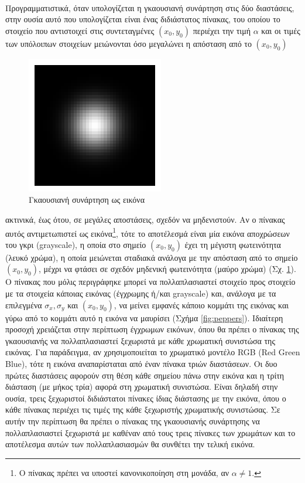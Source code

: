 \paragraph*{}
Προγραμματιστικά, όταν υπολογίζεται η γκαουσιανή συνάρτηση στις δύο διαστάσεις, στην ουσία αυτό που υπολογίζεται είναι ένας διδιάστατος πίνακας, του οποίου το στοιχείο που αντιστοιχεί στις συντεταγμένες $(x_0,y_0)$ περιέχει την τιμή $\alpha$ και οι τιμές των υπόλοιπων στοιχείων μειώνονται όσο μεγαλώνει η απόσταση από το $(x_0,y_0)$
\begin{figure}
\centerline{\includegraphics[scale=0.25]{./images/gauss2DImage.png}}
\caption{Γκαουσιανή συνάρτηση ως εικόνα}
\label{fig:2dbellimage}
\end{figure}
ακτινικά, έως ότου, σε μεγάλες αποστάσεις, σχεδόν να μηδενιστούν. Αν ο πίνακας αυτός αντιμετωπιστεί ως εικόνα\footnote{Ο πίνακας πρέπει να υποστεί κανονικοποίηση στη μονάδα, αν $\alpha \neq 1$.}, τότε το αποτέλεσμά είναι μία εικόνα αποχρώσεων του γκρι (grayscale), η οποία στο σημείο $(x_0,y_0)$ έχει τη μέγιστη φωτεινότητα (λευκό χρώμα), η οποία μειώνεται σταδιακά ανάλογα με την απόσταση από το σημείο $(x_0,y_0)$, μέχρι να φτάσει σε σχεδόν μηδενική φωτεινότητα (μαύρο χρώμα) (Σχ. \ref{fig:2dbellimage}). Ο πίνακας που μόλις περιγράφηκε μπορεί να πολλαπλασιαστεί στοιχείο προς στοιχείο με τα στοιχεία κάποιας εικόνας (έγχρωμης ή/και grayscale) και, ανάλογα με τα επιλεγμένα $\sigma_x,\sigma_y$ και $(x_0,y_0)$, να μείνει εμφανές κάποιο κομμάτι της εικόνας και γύρω από το κομμάτι αυτό η εικόνα να μαυρίσει (Σχήμα \ref{fig:peppers}). Ιδιαίτερη προσοχή χρειάζεται στην περίπτωση έγχρωμων εικόνων, όπου θα πρέπει ο πίνακας της γκαουσιανής να πολλαπλασιαστεί ξεχωριστά με κάθε χρωματική συνιστώσα της εικόνας. Για παράδειγμα, αν χρησιμοποιείται το χρωματικό μοντέλο RGB (Red Green Blue), τότε η εικόνα αναπαρίσταται από έναν πίνακα τριών διαστάσεων. Οι δυο πρώτες διαστάσεις αφορούν στη θέση κάθε σημείου πάνω στην εικόνα και η τρίτη διάσταση (με μήκος τρία) αφορά στη χρωματική συνιστώσα. Είναι δηλαδή στην ουσία, τρεις ξεχωριστοί διδιάστατοι πίνακες ίδιας διάστασης με την εικόνα, όπου ο κάθε πίνακας περιέχει τις τιμές της κάθε ξεχωριστής χρωματικής συνιστώσας. Σε αυτήν την περίπτωση θα πρέπει ο πίνακας της γκαουσιανής συνάρτησης να πολλαπλασιαστεί ξεχωριστά με καθέναν από τους τρεις πίνακες των χρωμάτων και το αποτέλεσμα αυτών των πολλαπλασιασμών θα συνθέτει την τελική εικόνα. 

